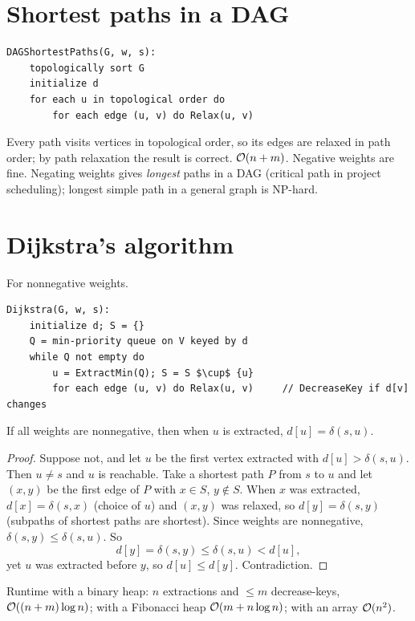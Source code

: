\section{Shortest paths in a DAG}
\begin{lstlisting}[style=pseudo]
DAGShortestPaths(G, w, s):
    topologically sort G
    initialize d
    for each u in topological order do
        for each edge (u, v) do Relax(u, v)
\end{lstlisting}
Every path visits vertices in topological order, so its edges are relaxed in path order; by path relaxation the result is correct. $\mathcal{O}(n+m)$.
Negative weights are fine. Negating weights gives \emph{longest} paths in a DAG (critical path in project scheduling); longest simple path in a general graph is NP-hard.

\section{Dijkstra's algorithm}
For nonnegative weights.
\begin{lstlisting}[style=pseudo]
Dijkstra(G, w, s):
    initialize d; S = {}
    Q = min-priority queue on V keyed by d
    while Q not empty do
        u = ExtractMin(Q); S = S $\cup$ {u}
        for each edge (u, v) do Relax(u, v)     // DecreaseKey if d[v] changes
\end{lstlisting}

\begin{theorem}
If all weights are nonnegative, then when $u$ is extracted, $d[u]=\delta(s,u)$.
\end{theorem}
\begin{proof}
Suppose not, and let $u$ be the first vertex extracted with $d[u]>\delta(s,u)$. Then $u\ne s$ and $u$ is reachable. Take a shortest path $P$ from $s$ to $u$ and let
$(x,y)$ be the first edge of $P$ with $x\in S$, $y\notin S$. When $x$ was extracted, $d[x]=\delta(s,x)$ (choice of $u$) and $(x,y)$ was relaxed, so
$d[y]=\delta(s,y)$ (subpaths of shortest paths are shortest). Since weights are nonnegative, $\delta(s,y)\le\delta(s,u)$. So
\[
d[y]=\delta(s,y)\le\delta(s,u)<d[u],
\]
yet $u$ was extracted before $y$, so $d[u]\le d[y]$. Contradiction.
\end{proof}
Runtime with a binary heap: $n$ extractions and $\le m$ decrease-keys, $\mathcal{O}((n+m)\log n)$; with a Fibonacci heap $\mathcal{O}(m+n\log n)$; with an array $\mathcal{O}(n^2)$.

